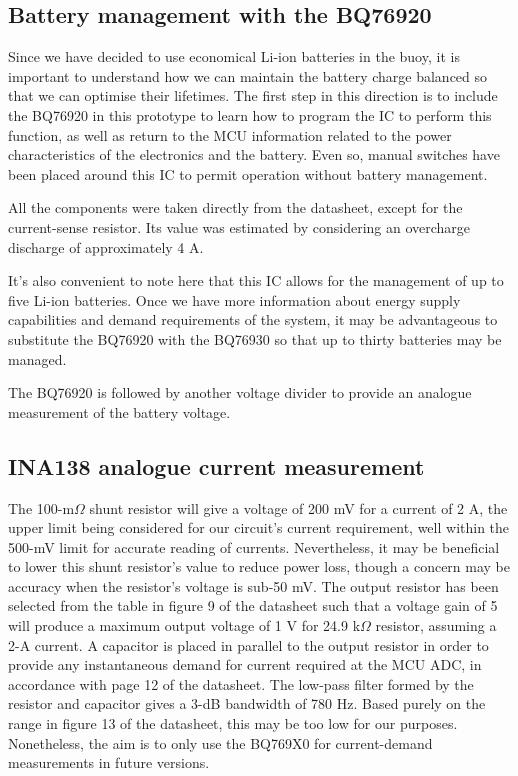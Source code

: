 \documentclass{article}
\begin{document}
\subsection{Battery management with the BQ76920}

Since we have decided to use economical Li-ion batteries in the buoy, it is important to understand how we can maintain the battery charge balanced so that we can optimise their lifetimes. The first step in this direction is to include the BQ76920 in this prototype to learn how to program the IC to perform this function, as well as return to the MCU information related to the power characteristics of the electronics and the battery. Even so, manual switches have been placed around this IC to permit operation without battery management. 

All the components were taken directly from the datasheet, except for the current-sense resistor. Its value was estimated by considering an overcharge discharge of approximately 4 A.

It's also convenient to note here that this IC allows for the management of up to five Li-ion batteries. Once we have more information about energy supply capabilities and demand requirements of the system, it may be advantageous to substitute the BQ76920 with the BQ76930 so that up to thirty batteries may be managed.

The BQ76920 is followed by another voltage divider to provide an analogue measurement of the battery voltage. 


\subsection{INA138 analogue current measurement}

The 100-m$\Omega$ shunt resistor will give a voltage of 200 mV for a current of 2 A, the upper limit being considered for our circuit's current requirement, well within the 500-mV limit for accurate reading of currents. Nevertheless, it may be beneficial to lower this shunt resistor's value to reduce power loss, though a concern may be accuracy when the resistor's voltage is sub-50 mV. The output resistor has been selected from the table in figure 9 of the datasheet such that a voltage gain of 5 will produce a maximum output voltage of 1 V for 24.9 k$\Omega$ resistor, assuming a 2-A current. A capacitor is placed in parallel to the output resistor in order to provide any instantaneous demand for current required at the MCU ADC, in accordance with page 12 of the datasheet. The low-pass filter formed by the resistor and capacitor gives a 3-dB bandwidth of 780 Hz. Based purely on the range in figure 13 of the datasheet, this may be too low for our purposes. Nonetheless, the aim is to only use the BQ769X0 for current-demand measurements in future versions.
\end{document}
